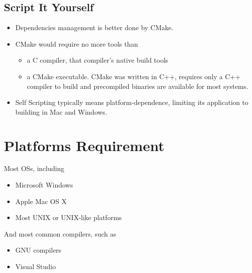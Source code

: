 \subsection{Script It Yourself}
  \begin{itemize}  
    \item Dependencies management is better done by CMake.
    \item CMake would require no more tools than 
      \begin{itemize}  
        \item a C compiler, that compiler's native build tools
        \item a CMake executable. CMake was written in C++, requires only a C++ compiler to build and precompiled binaries are available for most systems.  
      \end{itemize}  
    \item Self Scripting typically means platform-dependence, limiting its application to building in Mac and Windows.
  \end{itemize}  
\section{Platforms Requirement}
  Most OSs, including
  \begin{itemize}  
    \item Microsoft Windows
    \item Apple Mac OS X
    \item Most UNIX or UNIX-like platforms
  \end{itemize}  
  And most common compilers, such as 
  \begin{itemize}  
    \item GNU compilers 
    \item Visual Studio
  \end{itemize}  

